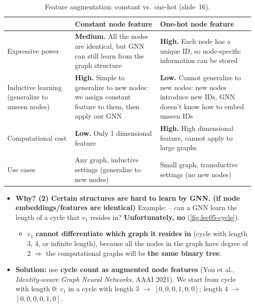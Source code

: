 \begin{table}[htbp]
  \centering\small
  \caption{Feature augmentation: constant vs.\ one-hot (slide~16).}
  \label{tab:lec05-onehot}
  \renewcommand{\arraystretch}{1.2}
  \begin{tabularx}{\textwidth}{@{}>{\raggedright\arraybackslash}p{2.7cm}>{\raggedright\arraybackslash}X>{\raggedright\arraybackslash}X@{}}
    \toprule
    & Constant node feature & One-hot node feature\\
    \midrule
    Expressive power & \textbf{Medium.} All the nodes are identical, but GNN
      can still learn from the graph structure
      & \textbf{High.} Each node has a unique ID, so node-specific information
      can be stored\\
    Inductive learning (generalize to unseen nodes)
      & \textbf{High.} Simple to generalize to new nodes: we assign constant
      feature to them, then apply our GNN
      & \textbf{Low.} Cannot generalize to new nodes: new nodes introduce new
      IDs, GNN doesn't know how to embed unseen IDs\\
    Computational cost & \textbf{Low.} Only 1 dimensional feature
      & \textbf{High.} High dimensional feature, cannot apply to large graphs\\
    Use cases & Any graph, inductive settings (generalize to new nodes)
      & Small graph, transductive settings (no new nodes)\\
    \bottomrule
  \end{tabularx}
\end{table}

\begin{itemize}
  \item \textbf{Why? (2) Certain structures are hard to learn by GNN. (if node embeddings/features are identical)}
    Example:  -- can a GNN learn the length of a
    cycle that $v_1$ resides in? \textbf{Unfortunately, no}
    (\cref{fig:lec05-cycle}):
    \begin{itemize}
      \item $v_1$ \textbf{cannot differentiate which graph it resides in}
        (cycle with length 3, 4, or infinite length), because all the nodes in
        the graph have degree of 2 $\Rightarrow$ the computational graphs will
        be \textbf{the same binary tree}.
    \end{itemize}
  \item \textbf{Solution:} use \textbf{cycle count as augmented node features}
    (You et al., \emph{Identity-aware Graph Neural Networks}, AAAI 2021). We
    start from cycle with length 0: $v_1$ in a cycle with length 3 $\to$
    $[0,0,0,1,0,0]$; length 4 $\to$ $[0,0,0,0,1,0]$.
\end{itemize}

